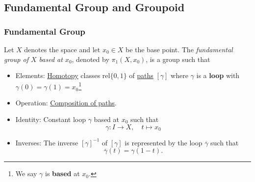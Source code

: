 \subsection{Fundamental Group and Groupoid}
\subsubsection{Fundamental Group}
\begin{definition}\label{def:fundamental-group}
	Let \(X\) denotes the space and let \(x_0\in X\) be the base point. The \emph{fundamental group of \(X\) based at \(x_0\)},
	denoted by \(\pi_1(X, x_0)\), is a group such that
	\begin{itemize}
		\item Elements: \hyperref[def:homotopy]{Homotopy} classes \(\mathrm{rel} \{0, 1\}\) of \hyperref[def:path]{paths} \([\gamma]\) where \(\gamma\) is a \textbf{loop}
		      with \(\gamma(0) = \gamma(1) = x_0\)\footnote{We say \(\gamma\) is \textbf{based} at \(x_0\).}
		      \begin{figure}[H]
			      \centering
			      \label{fig:def:fundamental-group-elements}
		      \end{figure}
		\item Operation: \hyperref[def:path-composition]{Composition of paths}.
		\item Identity: Constant loop \(\gamma\) based at \(x_0\) such that
		      \[
			      \gamma\colon I\to X,\quad t\mapsto x_0
		      \]
		\item Inverses: The inverse \([\gamma]^{-1}\) of \([\gamma]\) is represented by the loop \(\overline{\gamma}\) such that
		      \[
			      \overline{\gamma} (t) = \gamma(1-t).
		      \]
		      \begin{figure}[H]
			      \centering
			      \label{fig:def:fundamental-group-inverses}
		      \end{figure}
	\end{itemize}
\end{definition}
